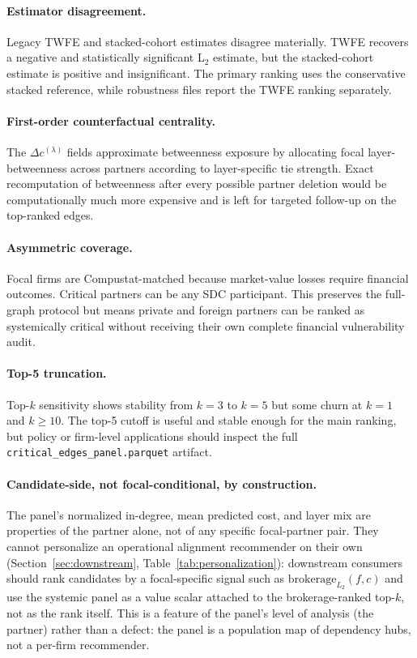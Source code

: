 \documentclass[11pt,letterpaper]{article}
\begin{document}
\paragraph{Estimator disagreement.}
Legacy TWFE and stacked-cohort estimates disagree materially.  TWFE
recovers a negative and statistically significant L$_2$ estimate, but
the stacked-cohort estimate is positive and insignificant.  The primary
ranking uses the conservative stacked reference, while robustness files
report the TWFE ranking separately.

\paragraph{First-order counterfactual centrality.}
The $\Delta c^{(\lambda)}$ fields approximate betweenness exposure by
allocating focal layer-betweenness across partners according to
layer-specific tie strength.  Exact recomputation of betweenness after
every possible partner deletion would be computationally much more
expensive and is left for targeted follow-up on the top-ranked edges.

\paragraph{Asymmetric coverage.}
Focal firms are Compustat-matched because market-value losses require
financial outcomes.  Critical partners can be any SDC participant.
This preserves the full-graph protocol but means private and foreign
partners can be ranked as systemically critical without receiving their
own complete financial vulnerability audit.

\paragraph{Top-5 truncation.}
Top-$k$ sensitivity shows stability from $k=3$ to $k=5$ but some churn
at $k=1$ and $k \geq 10$.  The top-5 cutoff is useful and stable enough
for the main ranking, but policy or firm-level applications should
inspect the full \texttt{critical\_edges\_panel.parquet} artifact.

\paragraph{Candidate-side, not focal-conditional, by construction.}
The panel's normalized in-degree, mean predicted cost, and layer mix
are properties of the partner alone, not of any specific
focal-partner pair.  They cannot personalize an operational alignment
recommender on their own (Section~\ref{sec:downstream},
Table~\ref{tab:personalization}): downstream consumers should rank
candidates by a focal-specific signal such as $\text{brokerage}_{L_2}(f, c)$
and use the systemic panel as a value scalar attached to the
brokerage-ranked top-$k$, not as the rank itself.  This is a feature
of the panel's level of analysis (the partner) rather than a defect:
the panel is a population map of dependency hubs, not a per-firm
recommender.
\end{document}
